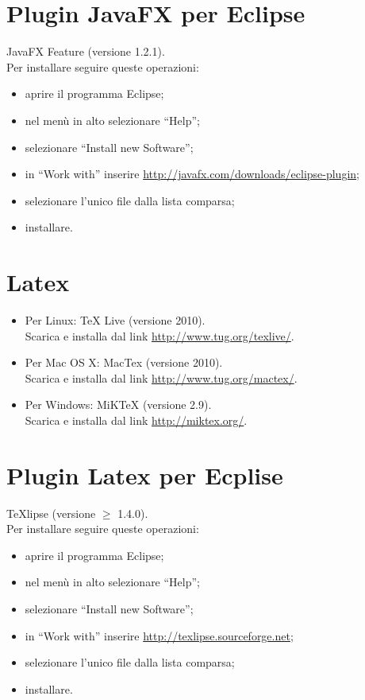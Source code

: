 \section{Plugin JavaFX per Eclipse}
JavaFX Feature (versione 1.2.1).
\\
Per installare seguire queste
operazioni: 
\begin{itemize}
\item {aprire il programma Eclipse;} 
\item {nel men\`u in alto selezionare ``Help'';}
\item {selezionare ``Install new Software'';}
\item {in ``Work with'' inserire \url{http://javafx.com/downloads/eclipse-plugin};}
\item {selezionare l'unico file dalla lista comparsa;}
\item {installare.}
\end{itemize} 

\section{Latex}
\begin{itemize}
\item {Per Linux: TeX Live (versione 2010). 
\\
Scarica e installa dal link
\url{http://www.tug.org/texlive/}.}
\item {Per Mac OS X: MacTex (versione 2010). 
\\
Scarica e installa dal link
\url{http://www.tug.org/mactex/}.}
\item {Per Windows: MiKTeX (versione 2.9). 
\\
Scarica e installa dal link
\url{http://miktex.org/}.}
\end{itemize}

\section{Plugin Latex per Ecplise}
TeXlipse (versione $\geq$ 1.4.0). 
\\
Per installare seguire queste
operazioni: 
\begin{itemize}
\item {aprire il programma Eclipse;} 
\item {nel men\`u in alto selezionare ``Help'';}
\item {selezionare ``Install new Software'';}
\item {in ``Work with'' inserire \url{http://texlipse.sourceforge.net};}
\item {selezionare l'unico file dalla lista comparsa;}
\item {installare.}
\end{itemize} 

